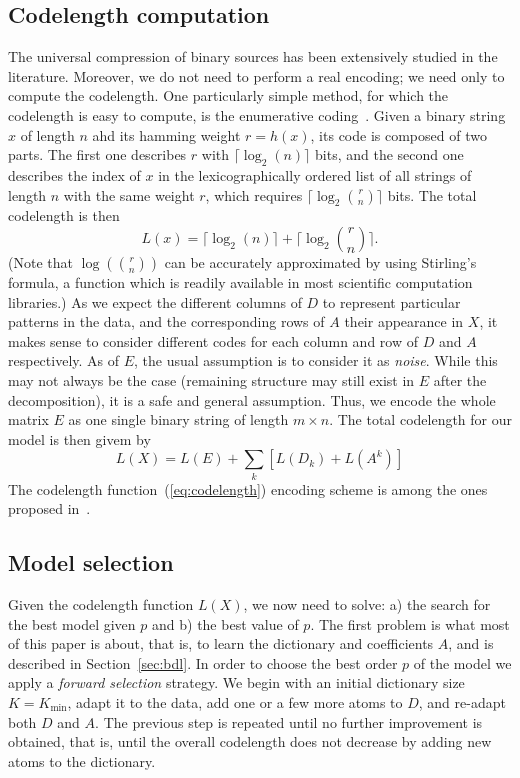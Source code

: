 \documentclass[twocolumn]{IEEEtran}
\theoremstyle{definition}
\newcommand{\refeq}[1]{(\ref{#1})}
\begin{document}
\subsection{Codelength computation}

The universal compression of binary sources has been extensively studied in the literature. Moreover, we do not need to perform a real encoding; we need only to compute the codelength. One particularly simple method, for which the codelength is easy to compute, is the enumerative coding~\cite{enum}. Given a binary string $x$ of length $n$ ahd its hamming weight $r=h(x)$, its code is composed of two parts. The first one describes $r$ with $\lceil\log_2(n)\rceil$ bits, and the second one describes the index of $x$ in the lexicographically ordered list of all strings of length $n$ with the same weight $r$, which requires $\lceil\log_2{r \choose n}\rceil$ bits. The total codelength is then $$L(x) = \lceil\log_2(n)\rceil + \lceil\log_2{r \choose n}\rceil.$$ (Note that $\log(r \choose n)$ can be accurately approximated by using Stirling's formula, a function which is readily available in most scientific computation libraries.)
As we expect the different columns of $D$ to represent particular patterns in the data, and the corresponding rows of $A$ their appearance in $X$, it makes sense to consider different codes for each column and row of $D$ and $A$ respectively. As of $E$, the usual assumption is to consider it as \emph{noise}. While this may not always be the case (remaining structure may still exist in $E$ after the decomposition), it is a safe and general assumption. Thus, we encode the whole matrix $E$ as one single binary string of length $m{\times}n$. The total codelength for our model is then givem by
\begin{equation}
L(X) = L(E) + \sum_k [ L(D_k) + L(A^k) ] 
\label{eq:codelength}
\end{equation} 
The codelength function~\refeq{eq:codelength} encoding scheme is among the ones proposed in~\cite{bmf-mdl}.

\subsection{Model selection}

Given the codelength function $L(X)$, we now need to solve: a) the search for the best model given $p$ and b) the best value of $p$. The first problem is what most of this paper is about, that is, to learn the dictionary and coefficients $A$, and is described in Section~\ref{sec:bdl}. In order to choose the best order $p$ of the model we apply a \emph{forward selection} strategy. We begin with an initial dictionary size $K=K_{\min}$, adapt it to the data, add one or a few more atoms to $D$, and re-adapt both $D$ and $A$. The previous step is repeated until no further improvement is obtained, that is, until the overall codelength does not decrease by adding new atoms to the dictionary.
\end{document}

